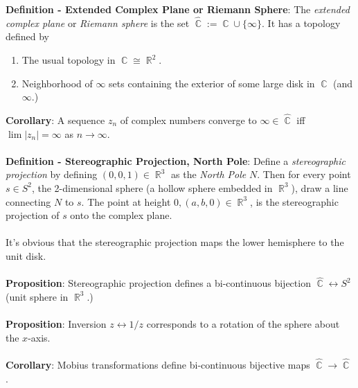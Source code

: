 \documentclass{article}
\DeclareMathOperator{\R}{\mathbb{R}}
\DeclareMathOperator{\C}{\mathbb{C}}
\begin{document}
\textbf{Definition - Extended Complex Plane or Riemann Sphere}: The \textit{extended complex plane} or \textit{Riemann sphere} is the set $\hat{\C} := \C \cup \{\infty\}$. It has a topology defined by \begin{enumerate}
    \item The usual topology in $\C \cong \R^2$.
    \item Neighborhood of $\infty$ sets containing the exterior of some large disk in $\C$ (and $\infty$.)
\end{enumerate} $ $ \\
\textbf{Corollary}: A sequence $z_n$ of complex numbers converge to $\infty \in \hat{\C}$ iff $\lim |z_n| = \infty$ as $n \rightarrow \infty$. \\ \\
\textbf{Definition - Stereographic Projection, North Pole}: Define a \textit{stereographic projection} by defining $(0, 0, 1) \in \R^3$ as the \textit{North Pole} $N$. Then for every point $s \in S^2$, the 2-dimensional sphere (a hollow sphere embedded in $\R^3$), draw a line connecting $N$ to $s$. The point at height $0, (a, b, 0) \in \R^3$, is the stereographic projection of $s$ onto the complex plane. \\ \\
It's obvious that the stereographic projection maps the lower hemisphere to the unit disk. \\ \\
\textbf{Proposition}: Stereographic projection defines a bi-continuous bijection $\hat{\C} \leftrightarrow S^2$ (unit sphere in $\R^3$.) \\ \\
\textbf{Proposition}: Inversion $z \leftrightarrow 1/z$ corresponds to a rotation of the sphere about the $x$-axis. \\ \\
\textbf{Corollary}: Mobius transformations define bi-continuous bijective maps $\hat{\C} \rightarrow \hat{\C}$. 
\end{document}
